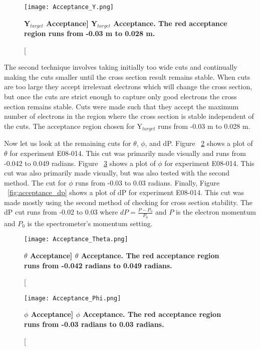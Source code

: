\begin{figure}[!ht]
\begin{center}
\texttt{[image: Acceptance\_Y.png]}
\end{center}
\caption[\bf{Y$_{target}$ Acceptance}]{
{\bf{Y$_{target}$ Acceptance.}} The red acceptance region runs from -0.03 m to 0.028 m.}
\label{fig:acceptance_y}
\end{figure}

The second technique involves taking initially too wide cuts and continually making the cuts smaller until the cross section result remains stable. When cuts are too large they accept irrelevant electrons which will change the cross section, but once the cuts are strict enough to capture only good electrons the cross section remains stable. Cuts were made such that they accept the maximum number of electrons in the region where the cross section is stable independent of the cuts. The acceptance region chosen for Y$_{target}$ runs from -0.03 m to 0.028 m.

Now let us look at the remaining cuts for $\theta$, $\phi$, and dP. Figure ~\ref{fig:acceptance_th} shows a plot of $\theta$ for experiment E08-014. This cut was primarily made visually and runs from -0.042 to 0.049 radians. Figure ~\ref{fig:acceptance_ph} shows a plot of $\phi$ for experiment E08-014. This cut was also primarily made visually, but was also tested with the second method. The cut for $\phi$ runs from -0.03 to 0.03 radians. Finally, Figure ~\ref{fig:acceptance_dp} shows a plot of dP for experiment E08-014. This cut was made mostly using the second method of checking for cross section stability. The dP cut runs from -0.02 to 0.03 where $dP = \frac{P-P_0}{P_0}$ and $P$ is the electron momentum and $P_0$ is the spectrometer's momentum setting.

\begin{figure}[!ht]
\begin{center}
\texttt{[image: Acceptance\_Theta.png]}
\end{center}
\caption[\bf{$\theta$ Acceptance}]{
{\bf{$\theta$ Acceptance.}} The red acceptance region runs from -0.042 radians to 0.049 radians.}
\label{fig:acceptance_th}
\end{figure}

\begin{figure}[!ht]
\begin{center}
\texttt{[image: Acceptance\_Phi.png]}
\end{center}
\caption[\bf{$\phi$ Acceptance}]{
{\bf{$\phi$ Acceptance.}} The red acceptance region runs from -0.03 radians to 0.03 radians.}
\label{fig:acceptance_ph}
\end{figure}

